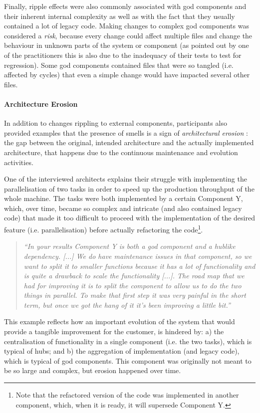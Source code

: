 Finally, ripple effects were also commonly associated with god components and their inherent internal complexity as well as with the fact that they usually contained a lot of legacy code. Making changes to complex god components was considered a \emph{risk}, because every change could affect multiple files and change the behaviour in unknown parts of the system or component (as pointed out by one of the practitioners this is also due to the inadequacy of their tests to test for regression).
Some god components contained files that were so tangled (i.e. affected by cycles) that even a simple change would have impacted several other files.
 

\paragraph{Architecture Erosion}
In addition to changes rippling to external components, participants also provided examples that the presence of smells is a sign of \emph{architectural erosion} \cite{Perry1992}: the gap between the original, intended architecture and the actually implemented architecture, that happens due to the continuous maintenance and evolution activities.

One of the interviewed architects explains their struggle with implementing the parallelisation of two tasks in order to speed up the production throughput of the whole machine. 
The tasks were both implemented by a certain Component Y, which, over time, became so complex and intricate (and also contained legacy code) that made it too difficult to proceed with the implementation of the desired feature (i.e. parallelisation) before actually refactoring the code\footnote{Note that the refactored version of the code was implemented in another component, which, when it is ready, it will supersede Component Y.}.
\begin{quote}
    \emph{``In your results Component Y is both a god component and a hublike dependency. [...] We do have maintenance issues in that component, so we want to split it to smaller functions because it has a lot of functionality and is quite a drawback to scale the functionality [...]. The road map that we had for improving it is to split the component to allow us to do the two things in parallel.
    To make that first step it was very painful in the short term, but once we got the hang of it it’s been improving a little bit.''}
\end{quote}
This example reflects how an important evolution of the system that would provide a tangible improvement for the customer, is hindered by: a) the centralisation of functionality in a single component (i.e. the two tasks), which is typical of hubs; and b) the aggregation of implementation (and legacy code), which is typical of god components. This component was originally not meant to be so large and complex, but erosion happened over time.

